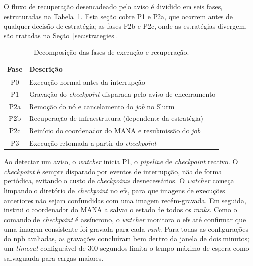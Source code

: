 \documentclass[a4paper,11pt]{article}
\begin{document}
            O fluxo de recuperação desencadeado pelo aviso é dividido em seis fases,
            estruturadas na Tabela~\ref{tab:phases}. Esta seção cobre P1 e P2a, que
            ocorrem antes de qualquer decisão de estratégia; as fases P2b e P2c, onde
            as estratégias divergem, são tratadas na Seção~\ref{sec:strategies}.

            \begin{table}[htb]
                \caption{Decomposição das fases de execução e recuperação.}
                \label{tab:phases}
                \centering
                \begin{tabular}{cl}
                    \toprule
                    \textbf{Fase} & \textbf{Descrição} \\
                    \midrule
                    P0  & Execução normal antes da interrupção \\
                    P1  & Gravação do \textit{checkpoint} disparada pelo aviso de encerramento \\
                    P2a & Remoção do nó e cancelamento do \textit{job} no Slurm \\
                    P2b & Recuperação de infraestrutura (dependente da estratégia) \\
                    P2c & Reinício do coordenador do MANA e resubmissão do \textit{job} \\
                    P3  & Execução retomada a partir do \textit{checkpoint} \\
                    \bottomrule
                \end{tabular}
            \end{table}

            Ao detectar um aviso, o \textit{watcher} inicia P1, o \textit{pipeline} de
            \textit{checkpoint} reativo. O \textit{checkpoint} é sempre disparado por
            eventos de interrupção, não de forma periódica, evitando o custo de
            \textit{checkpoints} desnecessários. O \textit{watcher} começa limpando o
            diretório de \textit{checkpoint} no \gls{efs}, para que imagens de execuções
            anteriores não sejam confundidas com uma imagem recém-gravada. Em seguida,
            instrui o coordenador do MANA a salvar o estado de todos os \textit{ranks}.
            Como o comando de \textit{checkpoint} é assíncrono, o \textit{watcher}
            monitora o \gls{efs} até confirmar que uma imagem consistente foi gravada
            para cada \textit{rank}. Para todas as configurações do \gls{npb} avaliadas,
            as gravações concluíram bem dentro da janela de dois minutos; um
            \textit{timeout} configurável de 300 segundos limita o tempo máximo de
            espera como salvaguarda para cargas maiores.
\end{document}
